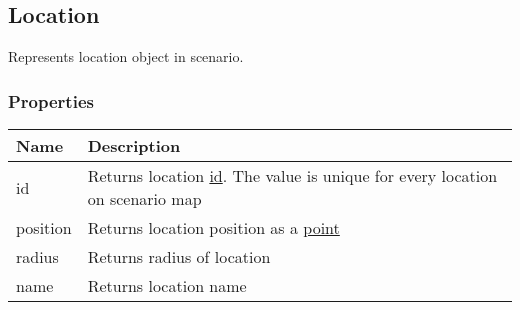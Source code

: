 \subsection{Location}
\label{Location}
Represents location object in scenario.
\subsubsection{Properties}
\begin{center}
\begin{tabularx}{\linewidth}{| l | X |}
\hline
\textbf{Name} & \textbf{Description} \\
\hline
id & Returns location \hyperref[Id]{id}. The value is unique for every location on scenario map\\
\hline
position & Returns location position as a \hyperref[Point]{point}\\
\hline
radius & Returns radius of location\\
\hline
name & Returns location name\\
\hline
\end{tabularx}
\end{center}
